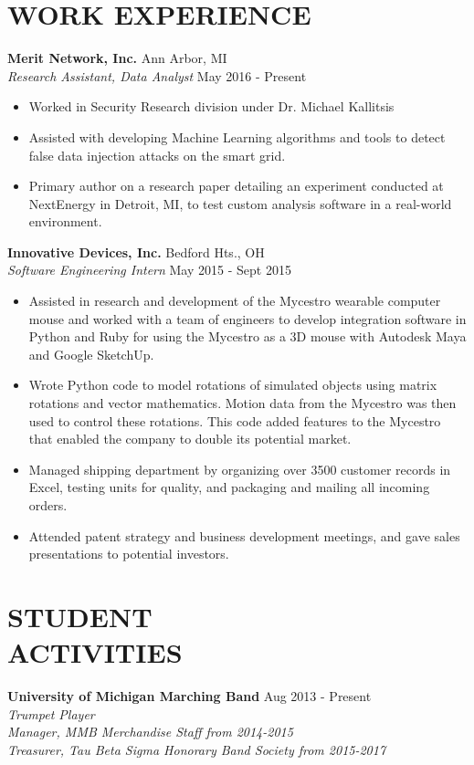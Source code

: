 \documentclass[margin,11pt]{res}
\begin{document}
\begin{resume}
\section{WORK EXPERIENCE}
\textbf{Merit Network, Inc.} \hfill Ann Arbor, MI\\
\textsl{Research Assistant, Data Analyst} \hfill May 2016 - Present
\begin{itemize}
	\itemsep -2pt
	\item Worked in Security Research division under Dr. Michael Kallitsis
	\item Assisted with developing Machine Learning algorithms and tools to detect false data injection attacks on the smart grid.
	\item Primary author on a research paper detailing an experiment conducted at NextEnergy in Detroit, MI, to test custom analysis software in a real-world environment.
\end{itemize}

\vspace{-10pt}
\textbf{Innovative Devices, Inc.} \hfill Bedford Hts., OH\\
\textsl{Software Engineering Intern} \hfill May 2015 - Sept 2015
\begin{itemize}
	\itemsep -2pt
	\item Assisted in research and development of the Mycestro wearable computer mouse and worked with a team of engineers to develop integration software in Python and Ruby for using the Mycestro as a 3D mouse with Autodesk Maya and Google SketchUp.
	\item Wrote Python code to model rotations of simulated objects using matrix rotations and vector mathematics. Motion data from the Mycestro was then used to control these rotations. This code added features to the Mycestro that enabled the company to double its potential market. 
	\item Managed shipping department by organizing over 3500 customer records in Excel, testing units for quality, and packaging and mailing all incoming orders.
	\item Attended patent strategy and business development meetings, and gave sales presentations to potential investors.
\end{itemize}

\vspace{-10pt}
\section{STUDENT\\ACTIVITIES}
\textbf{University of Michigan Marching Band} \hfill Aug 2013 - Present\\
\textsl{Trumpet Player}\\
\textsl{Manager, MMB Merchandise Staff from 2014-2015}\\
\textsl{Treasurer, Tau Beta Sigma Honorary Band Society from 2015-2017}\\
\vspace{-10pt}


\end{resume}
\end{document}

